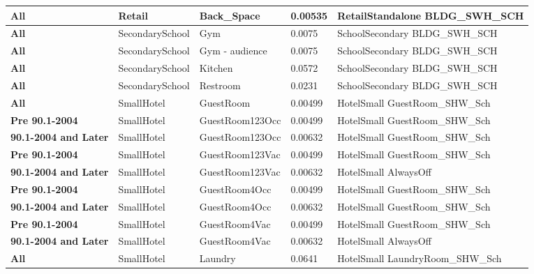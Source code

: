 \begin{table}
\begin{tabular}{|p{3cm}|p{3cm}|p{3cm}|p{3cm}|p{3cm}|}
\textbf{All}                     & Retail          & Back\_Space                          & 0.00535 & RetailStandalone   BLDG\_SWH\_SCH  \\ \hline
\textbf{All}                     & SecondarySchool & Gym                                  & 0.0075  & SchoolSecondary   BLDG\_SWH\_SCH   \\ \hline
\textbf{All}                     & SecondarySchool & Gym - audience                       & 0.0075  & SchoolSecondary   BLDG\_SWH\_SCH   \\ \hline
\textbf{All}                     & SecondarySchool & Kitchen                              & 0.0572  & SchoolSecondary   BLDG\_SWH\_SCH   \\ \hline
\textbf{All}                     & SecondarySchool & Restroom                             & 0.0231  & SchoolSecondary   BLDG\_SWH\_SCH   \\ \hline
\textbf{All}                     & SmallHotel      & GuestRoom                            & 0.00499 & HotelSmall   GuestRoom\_SHW\_Sch   \\ \hline
\textbf{Pre 90.1-2004}  & SmallHotel      & GuestRoom123Occ                      & 0.00499 & HotelSmall   GuestRoom\_SHW\_Sch   \\ \hline
\textbf{90.1-2004 and Later} & SmallHotel      & GuestRoom123Occ                      & 0.00632 & HotelSmall   GuestRoom\_SHW\_Sch   \\ \hline
\textbf{Pre 90.1-2004}  & SmallHotel      & GuestRoom123Vac                      & 0.00499 & HotelSmall   GuestRoom\_SHW\_Sch   \\ \hline
\textbf{90.1-2004 and Later} & SmallHotel      & GuestRoom123Vac                      & 0.00632 & HotelSmall AlwaysOff               \\ \hline
\textbf{Pre 90.1-2004}  & SmallHotel      & GuestRoom4Occ                        & 0.00499 & HotelSmall   GuestRoom\_SHW\_Sch   \\ \hline
\textbf{90.1-2004 and Later} & SmallHotel      & GuestRoom4Occ                        & 0.00632 & HotelSmall   GuestRoom\_SHW\_Sch   \\ \hline
\textbf{Pre 90.1-2004}  & SmallHotel      & GuestRoom4Vac                        & 0.00499 & HotelSmall   GuestRoom\_SHW\_Sch   \\ \hline
\textbf{90.1-2004 and Later} & SmallHotel      & GuestRoom4Vac                        & 0.00632 & HotelSmall AlwaysOff               \\ \hline
\textbf{All}                     & SmallHotel      & Laundry                              & 0.0641  & HotelSmall   LaundryRoom\_SHW\_Sch \\ \hline
\end{tabular}
\end{table}